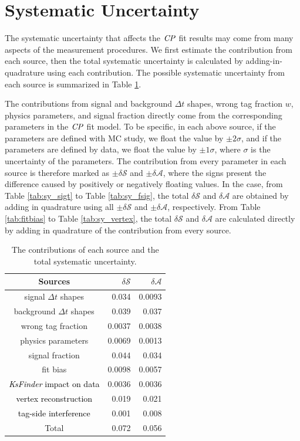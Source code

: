 \section{Systematic Uncertainty}
The systematic uncertainty that affects the $\it{CP}$ fit results may come from many aspects of the measurement procedures. We first estimate the contribution from each source, then the total systematic uncertainty  is calculated by adding-in-quadrature using each contribution. The possible systematic uncertainty from each source is summarized in Table \ref{tab:sy_sub}. 

The contributions from signal and background $\Delta t$ shapes, wrong tag fraction $w$, physics parameters, and signal fraction directly come from the corresponding parameters in the $\it{CP}$ fit model. To be specific, in each above source, if the parameters are defined with MC study, we float the value by $\pm 2 \sigma$, and if the parameters are defined by data, we float the value by $\pm 1 \sigma$, where $\sigma$ is the uncertainty of the parameters. The contribution from every parameter in each source is therefore marked as $\pm \delta \mathcal{S}$ and $\pm \delta \mathcal{A}$, where the signs present the difference caused by positively or negatively floating values. In the case, from Table \ref{tab:sy_sigt} to Table \ref{tab:sy_fsig}, the total $\delta \mathcal{S}$ and  $\delta \mathcal{A}$ are obtained by adding in quadrature using all $\pm \delta \mathcal{S}$ and $\pm\delta \mathcal{A}$, respectively. From Table \ref{tab:fitbias} to Table \ref{tab:sy_vertex}, the total $\delta \mathcal{S}$ and  $\delta \mathcal{A}$ are calculated directly by adding in quadrature of the contribution from every source.

\begin{table}[H]
	\centering
	\caption{The contributions of each source and the total systematic uncertainty.  }
	\label{tab:sy_sub}
	\begin{tabular}{c|r|r} 
		\hline
		Sources &  $\delta \mathcal{S}$ & $\delta \mathcal{A}$\\
		\hline
		signal $\Delta t$ shapes & 0.034 & 0.0093 \\
		background $\Delta t$ shapes & 0.039 & 0.037\\
		wrong tag fraction & 0.0037 & 0.0038\\
		physics parameters & 0.0069 & 0.0013\\ 
		signal fraction  & 0.044 & 0.034 \\
		fit bias & 0.0098 & 0.0057 \\
		\textcolor{black}{\textit{KsFinder} impact on data} & $0.0036$ & $0.0036$\\
		\textcolor{black}{vertex reconstruction} & 0.019 & 0.021\\
		\textcolor{black}{tag-side interference} & 0.001 & 0.008\\
		\hline
		Total & 0.072 & 0.056\\
		\hline
	\end{tabular}
\end{table}

